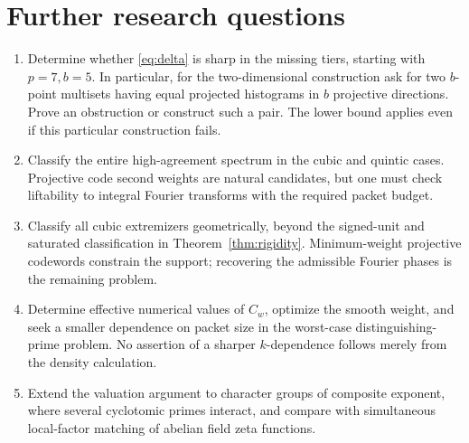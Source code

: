 \documentclass[11pt]{article}
\theoremstyle{definition}\newtheorem{definition}[theorem]{Definition}
\theoremstyle{remark}\newtheorem{remark}[theorem]{Remark}
\begin{document}
\section{Further research questions}
\begin{enumerate}
\item Determine whether \eqref{eq:delta} is sharp in the missing tiers, starting with $p=7,b=5$. In particular, for the two-dimensional construction ask for two $b$-point multisets having equal projected histograms in $b$ projective directions. Prove an obstruction or construct such a pair. The lower bound applies even if this particular construction fails.
\item Classify the entire high-agreement spectrum in the cubic and quintic cases. Projective code second weights are natural candidates, but one must check liftability to integral Fourier transforms with the required packet budget.
\item Classify all cubic extremizers geometrically, beyond the signed-unit and saturated classification in Theorem~\ref{thm:rigidity}. Minimum-weight projective codewords constrain the support; recovering the admissible Fourier phases is the remaining problem.
\item Determine effective numerical values of $C_w$, optimize the smooth weight, and seek a smaller dependence on packet size in the worst-case distinguishing-prime problem. No assertion of a sharper $k$-dependence follows merely from the density calculation.
\item Extend the valuation argument to character groups of composite exponent, where several cyclotomic primes interact, and compare with simultaneous local-factor matching of abelian field zeta functions.
\end{enumerate}
\end{document}
